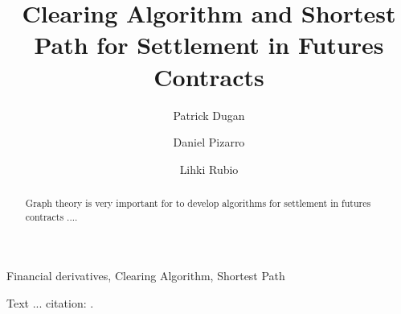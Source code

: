 \documentclass[preprint,reqno,12pt]{elsarticle}
\theoremstyle{definition}
\numberwithin{equation}{section}
\begin{document}
\begin{frontmatter}  
   
\title{Clearing Algorithm and Shortest Path for Settlement in Futures Contracts}    

\author[pd]{Patrick Dugan}  
\author[dp]{Daniel Pizarro}  
\author[rb]{Lihki Rubio}  
  
  
\address[pd]{Tradelayer, Conc\'{o}n, Valparaiso, Chile}   
  
\begin{abstract}

Graph theory is very important for to develop algorithms for settlement in futures contracts .... 

\end{abstract} 
   
 
\begin{keyword} 
Financial derivatives, Clearing Algorithm, Shortest Path  
 \end{keyword}
 
\end{frontmatter} 

Text ... citation: \cite{JS2015}.


% 




% 
% 


% 
% 
% 
% 
% 
% 
% 
% 

\newpage


 
  
\end{document}
